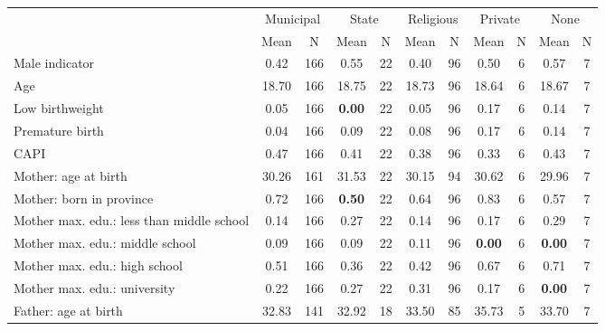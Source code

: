 \begin{tabular}{l c c c c c c c c c c}
\toprule
& \multicolumn{2}{c}{Municipal} & \multicolumn{2}{c}{State} & \multicolumn{2}{c}{Religious} & \multicolumn{2}{c}{Private} & \multicolumn{2}{c}{None} \\
& \scriptsize Mean & \scriptsize N & \scriptsize Mean & \scriptsize N & \scriptsize Mean & \scriptsize N & \scriptsize Mean & \scriptsize N & \scriptsize Mean & \scriptsize N \\
\midrule
Male indicator &      0.42 &       166 &      0.55 &        22 &      0.40 &        96 &      0.50 &         6 &      0.57 &         7 \\
Age &     18.70 &       166 &     18.75 &        22 &     18.73 &        96 &     18.64 &         6 &     18.67 &         7 \\
Low birthweight &      0.05 &       166 & \textbf{     0.00} &        22 &      0.05 &        96 &      0.17 &         6 &      0.14 &         7 \\
Premature birth &      0.04 &       166 &      0.09 &        22 &      0.08 &        96 &      0.17 &         6 &      0.14 &         7 \\
CAPI &      0.47 &       166 &      0.41 &        22 &      0.38 &        96 &      0.33 &         6 &      0.43 &         7 \\
Mother: age at birth &     30.26 &       161 &     31.53 &        22 &     30.15 &        94 &     30.62 &         6 &     29.96 &         7 \\
Mother: born in province &      0.72 &       166 & \textbf{     0.50} &        22 &      0.64 &        96 &      0.83 &         6 &      0.57 &         7 \\
Mother max. edu.: less than middle school &      0.14 &       166 &      0.27 &        22 &      0.14 &        96 &      0.17 &         6 &      0.29 &         7 \\
Mother max. edu.: middle school &      0.09 &       166 &      0.09 &        22 &      0.11 &        96 & \textbf{     0.00} &         6 & \textbf{     0.00} &         7 \\
Mother max. edu.: high school &      0.51 &       166 &      0.36 &        22 &      0.42 &        96 &      0.67 &         6 &      0.71 &         7 \\
Mother max. edu.: university &      0.22 &       166 &      0.27 &        22 &      0.31 &        96 &      0.17 &         6 & \textbf{     0.00} &         7 \\
Father: age at birth &     32.83 &       141 &     32.92 &        18 &     33.50 &        85 &     35.73 &         5 &     33.70 &         7 \\

\end{tabular}

